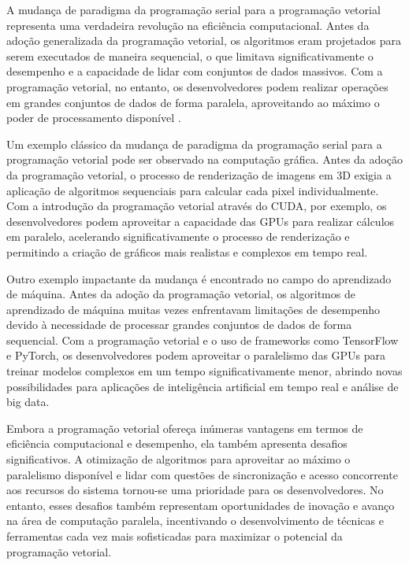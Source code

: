 \documentclass[12pt,
openright, 
oneside, %
a4paper,    %
brazil]{facom-ufu-abntex2}
\begin{document}
A mudança de paradigma da programação serial para a programação vetorial representa uma verdadeira revolução na eficiência computacional. Antes da adoção generalizada da programação vetorial, os algoritmos eram projetados para serem executados de maneira sequencial, o que limitava significativamente o desempenho e a capacidade de lidar com conjuntos de dados massivos. Com a programação vetorial, no entanto, os desenvolvedores podem realizar operações em grandes conjuntos de dados de forma paralela, aproveitando ao máximo o poder de processamento disponível \cite{hennessy2011}.


Um exemplo clássico da mudança de paradigma da programação serial para a programação vetorial pode ser observado na computação gráfica. Antes da adoção da programação vetorial, o processo de renderização de imagens em 3D exigia a aplicação de algoritmos sequenciais para calcular cada pixel individualmente. Com a introdução da programação vetorial através do CUDA, por exemplo, os desenvolvedores podem aproveitar a capacidade das GPUs para realizar cálculos em paralelo, acelerando significativamente o processo de renderização e permitindo a criação de gráficos mais realistas e complexos em tempo real.

Outro exemplo impactante da mudança é encontrado no campo do aprendizado de máquina. Antes da adoção da programação vetorial, os algoritmos de aprendizado de máquina muitas vezes enfrentavam limitações de desempenho devido à necessidade de processar grandes conjuntos de dados de forma sequencial. Com a programação vetorial e o uso de frameworks como TensorFlow e PyTorch, os desenvolvedores podem aproveitar o paralelismo das GPUs para treinar modelos complexos em um tempo significativamente menor, abrindo novas possibilidades para aplicações de inteligência artificial em tempo real e análise de big data.

Embora a programação vetorial ofereça inúmeras vantagens em termos de eficiência computacional e desempenho, ela também apresenta desafios significativos. A otimização de algoritmos para aproveitar ao máximo o paralelismo disponível e lidar com questões de sincronização e acesso concorrente aos recursos do sistema tornou-se uma prioridade para os desenvolvedores. No entanto, esses desafios também representam oportunidades de inovação e avanço na área de computação paralela, incentivando o desenvolvimento de técnicas e ferramentas cada vez mais sofisticadas para maximizar o potencial da programação vetorial.
\end{document}

